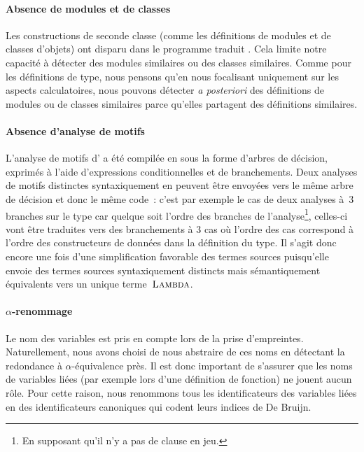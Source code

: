 \paragraph{Absence de modules et de classes}
Les constructions de seconde classe (comme les définitions de modules
et de classes d'objets) ont disparu dans le programme traduit
{\LambdaCode}. Cela limite notre capacité à détecter des modules
similaires ou des classes similaires. Comme pour les définitions de
type, nous pensons qu'en nous focalisant uniquement sur les aspects
calculatoires, nous pouvons détecter \textit{a posteriori} des
définitions de modules ou de classes similaires parce qu'elles
partagent des définitions similaires.

\paragraph{Absence d'analyse de motifs}
L'analyse de motifs d'{\OCaml} a été compilée en {\LambdaCode} sous la
forme d'arbres de décision, exprimés à l'aide d'expressions
conditionnelles et de branchements. Deux analyses de motifs distinctes
syntaxiquement en {\OCaml} peuvent être envoyées vers le même arbre de
décision et donc le même code~\LambdaCode: c'est par exemple le cas de deux
analyses à~$3$ branches sur le type  car quelque soit l'ordre des branches de
l'analyse\footnote{En supposant qu'il n'y a pas de clause
   en jeu.}, celles-ci vont être traduites vers des
branchements à $3$ cas où l'ordre des cas correspond à l'ordre des
constructeurs de données dans la définition du type. Il s'agit donc
encore une fois d'une simplification favorable des termes sources
puisqu'elle envoie des termes sources syntaxiquement distincts mais
sémantiquement équivalents vers un unique terme~$\textsc{Lambda}$.

\paragraph{$\alpha$-renommage}

Le nom des variables est pris en compte lors de la prise d'empreintes.
Naturellement, nous avons choisi de nous abstraire de ces noms en
détectant la redondance à $\alpha$-équivalence près. Il est donc
important de s'assurer que les noms de variables liées (par exemple
lors d'une définition de fonction) ne jouent aucun rôle. Pour cette
raison, nous renommons tous les identificateurs des variables liées en
des identificateurs canoniques qui codent leurs indices de De Bruijn.

